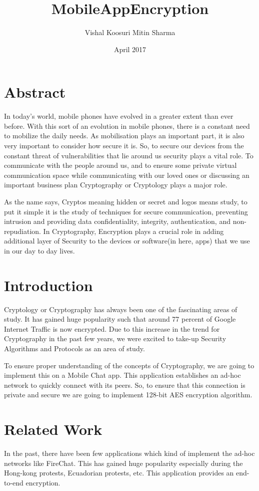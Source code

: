 \documentclass{article}
\title{MobileAppEncryption}
\author{Vishal Koosuri \cr Mitin Sharma}
\date{April 2017}
\begin{document}
\maketitle

\section{Abstract}
In today's world, mobile phones have evolved in a greater extent than ever before. With this sort of an evolution in mobile phones, there is a constant need to mobilize the daily needs. As mobilisation plays an important part, it is also very important to consider how secure it is. So, to secure our devices from the constant threat of vulnerabilities that lie around us security plays a vital role. To communicate with the people around us, and to ensure some private virtual communication space while communicating with our loved ones or discussing an important business plan Cryptography or Cryptology plays a major role. 

As the name says, Cryptos meaning hidden or secret and logos means study, to put it simple it is the study of techniques for secure communication, preventing intrusion and providing data confidentiality, integrity, authentication, and non-repudiation.
In Cryptography, Encryption plays a crucial role in adding additional layer of Security to the devices or software(in here, apps) that we use in our day to day lives.  

\section{Introduction}
Cryptology or Cryptography has always been one of the fascinating areas of study. It has gained huge popularity such that around 77 percent of Google Internet Traffic is now encrypted. Due to this increase in the trend for Cryptography in the past few years, we were excited to take-up Security Algorithms and Protocols as an area of study.

To ensure proper understanding of the concepts of Cryptography, we are going to implement this on a Mobile Chat app. This application establishes an ad-hoc network to quickly connect with its peers. So, to ensure that this connection is private and secure we are going to implement 128-bit AES encryption algorithm. 

\section{Related Work}
In the past, there have been few applications which kind of implement the ad-hoc networks like FireChat. This has gained huge popularity especially during the Hong-kong protests, Ecuadorian protests, etc. This application provides an end-to-end encryption.
\end{document}
